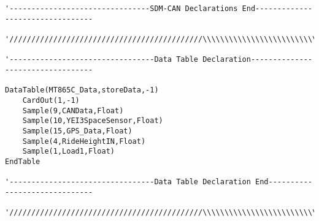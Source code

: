 \begin{lstlisting}[basicstyle=\tiny]
'--------------------------------SDM-CAN Declarations End---------------------------------

'////////////////////////////////////////////\\\\\\\\\\\\\\\\\\\\\\\\\\\\\\\\\\\\\\\\\\\\\

'---------------------------------Data Table Declaration----------------------------------

DataTable(MT865C_Data,storeData,-1)
    CardOut(1,-1)
    Sample(9,CANData,Float)
    Sample(10,YEI3SpaceSensor,Float)
    Sample(15,GPS_Data,Float)
    Sample(4,RideHeightIN,Float)
    Sample(1,Load1,Float)
EndTable

'---------------------------------Data Table Declaration End------------------------------
  
'////////////////////////////////////////////\\\\\\\\\\\\\\\\\\\\\\\\\\\\\\\\\\\\\\\\\\\\\


\end{lstlisting}
